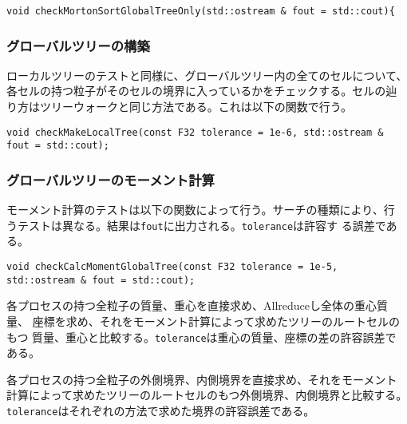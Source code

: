 \begin{screen}
\begin{verbatim}
void checkMortonSortGlobalTreeOnly(std::ostream & fout = std::cout){
\end{verbatim}
\end{screen}

\subsubsection{グローバルツリーの構築}

ローカルツリーのテストと同様に、グローバルツリー内の全てのセルについて、
各セルの持つ粒子がそのセルの境界に入っているかをチェックする。セルの辿
り方はツリーウォークと同じ方法である。これは以下の関数で行う。

\begin{screen}
\begin{verbatim}
void checkMakeLocalTree(const F32 tolerance = 1e-6, std::ostream & fout = std::cout);
\end{verbatim}
\end{screen}

\subsubsection{グローバルツリーのモーメント計算}

モーメント計算のテストは以下の関数によって行う。サーチの種類により、行
うテストは異なる。結果は{\tt fout}に出力される。{\tt tolerance}は許容す
る誤差である。

\begin{screen}
\begin{verbatim}
void checkCalcMomentGlobalTree(const F32 tolerance = 1e-5, std::ostream & fout = std::cout);
\end{verbatim}
\end{screen}


各プロセスの持つ全粒子の質量、重心を直接求め、Allreduceし全体の重心質量、
座標を求め、それをモーメント計算によって求めたツリーのルートセルのもつ
質量、重心と比較する。{\tt tolerance}は重心の質量、座標の差の許容誤差で
ある。



各プロセスの持つ全粒子の外側境界、内側境界を直接求め、それをモーメント
計算によって求めたツリーのルートセルのもつ外側境界、内側境界と比較する。
{\tt tolerance}はそれぞれの方法で求めた境界の許容誤差である。

